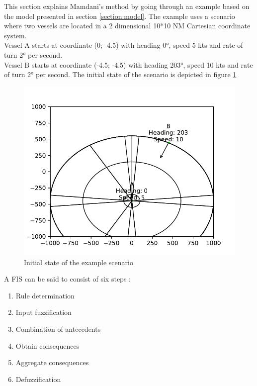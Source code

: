 This section  explains Mamdani's method by going through an example based on the model presented in section \ref{section:model}. The example uses a scenario where two vessels are located in a 2 dimensional 10*10 NM Cartesian coordinate system.\\
Vessel A starts at coordinate (0; -4.5) with heading \ang{0}, speed 5 kts and rate of turn \ang{2}  per second.\\
Vessel B starts at coordinate (-4.5; -4.5) with heading \ang{203}, speed 10 kts and rate of turn \ang{2}  per second.
The initial state of the scenario is depicted in figure \ref{fig:scenario_1a}
\begin{figure}[H]
    \centering
    \includegraphics[width=\textwidth]{Figures/scenario_1a}
    \caption{Initial state of the example scenario}
    \label{fig:scenario_1a}
\end{figure}


A FIS can be said to consist of six steps \cite{fis_princeston}:
\begin{enumerate}
    \item Rule determination
    \item Input fuzzification
    \item Combination of antecedents
    \item Obtain consequences
    \item Aggregate consequences
    \item Defuzzification
\end{enumerate}

